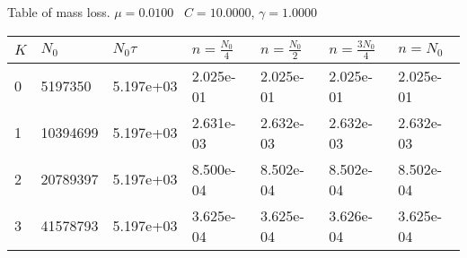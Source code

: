 \begin{center}
Table of mass loss. $\mu = 0.0100$ \, $C = 10.0000$, $\gamma = 1.0000$
  
\begin{tabular}{|p{0.8in}|p{0.8in}|p{0.8in}|p{0.8in}|p{0.8in}|p{0.8in}|p{0.8in}|} \hline
$K$ &$N_0$ &$N_0 \tau$ &$n = \frac{N_0}{4}$ &$n = \frac{N_0}{2}$ &$n = \frac{3N_0}{4}$ &$n = N_0$ \\ \hline 
0 &5197350 &5.197e+03 &2.025e-01 &2.025e-01 &2.025e-01 &2.025e-01 \\ \hline 
1 &10394699 &5.197e+03 &2.631e-03 &2.632e-03 &2.632e-03 &2.632e-03 \\ \hline 
2 &20789397 &5.197e+03 &8.500e-04 &8.502e-04 &8.502e-04 &8.502e-04 \\ \hline 
3 &41578793 &5.197e+03 &3.625e-04 &3.625e-04 &3.626e-04 &3.625e-04 \\ \hline 

\end{tabular}\\[20pt]
\end{center}
